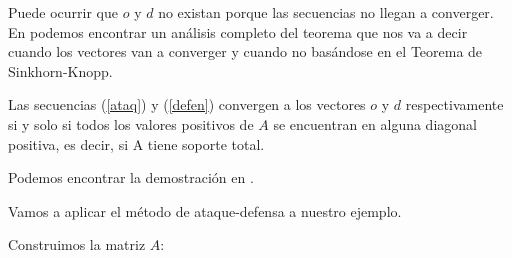 Puede ocurrir que $o$ y $d$ no existan porque las secuencias no llegan a converger. En \cite[págs 87-90]{libro_rankings} podemos encontrar un análisis completo del teorema que nos va a decir cuando los vectores van a converger y cuando no basándose en el Teorema de Sinkhorn-Knopp.
\begin{teo}
	Las secuencias (\ref{ataq}) y (\ref{defen}) convergen a los vectores $o$ y $d$ respectivamente si y solo si todos los valores positivos de $A$ se encuentran en alguna diagonal positiva, es decir, si A tiene soporte total. 
\end{teo}
Podemos encontrar la demostración en \cite[págs 90-91]{libro_rankings}.\\
    
\begin{ejem} Vamos a aplicar el método de ataque-defensa a nuestro ejemplo.\\
\end{ejem}	
	Construimos la matriz $A$:

